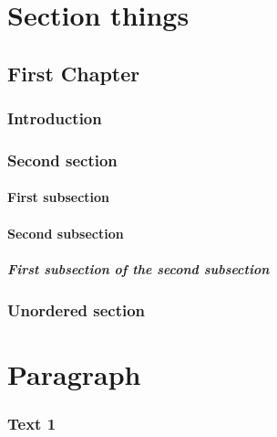 \documentclass{report}
\begin{document}
\tableofcontents{}

\part{Section things}

\chapter{First Chapter}

\section{Introduction}
\blindtext

\section{Second section}
\blindtext

\subsection{First subsection}
\blindtext

\subsection{Second subsection}
\blindtext

\subsubsection{First subsection of the second subsection}
\blindtext

\section*{Unordered section}
\blindtext

\part{Paragraph}

\section{Text 1}
\paragraph{\blindtext}

\subparagraph{\blindtext}
\end{document}
